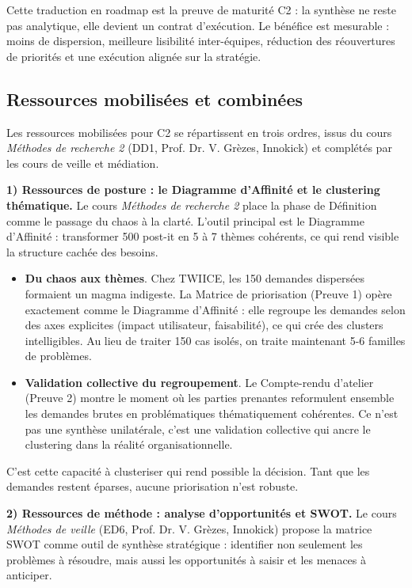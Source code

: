 Cette traduction en roadmap est la preuve de maturité C2 : la synthèse ne reste pas analytique, elle devient un contrat d'exécution. Le bénéfice est mesurable : moins de dispersion, meilleure lisibilité inter-équipes, réduction des réouvertures de priorités et une exécution alignée sur la stratégie.

\subsection{Ressources mobilisées et combinées}

Les ressources mobilisées pour C2 se répartissent en trois ordres, issus du cours \textit{Méthodes de recherche 2} (DD1, Prof. Dr. V. Grèzes, Innokick) et complétés par les cours de veille et médiation.

\textbf{1) Ressources de posture : le Diagramme d'Affinité et le clustering thématique.}
Le cours \textit{Méthodes de recherche 2} place la phase de Définition comme le passage du chaos à la clarté. L'outil principal est le Diagramme d'Affinité : transformer 500 post-it en 5 à 7 thèmes cohérents, ce qui rend visible la structure cachée des besoins.

\begin{itemize}
  \item \textbf{Du chaos aux thèmes}. Chez TWIICE, les 150 demandes dispersées formaient un magma indigeste. La Matrice de priorisation (Preuve 1) opère exactement comme le Diagramme d'Affinité : elle regroupe les demandes selon des axes explicites (impact utilisateur, faisabilité), ce qui crée des clusters intelligibles. Au lieu de traiter 150 cas isolés, on traite maintenant 5-6 familles de problèmes.
  \item \textbf{Validation collective du regroupement}. Le Compte-rendu d'atelier (Preuve 2) montre le moment où les parties prenantes reformulent ensemble les demandes brutes en problématiques thématiquement cohérentes. Ce n'est pas une synthèse unilatérale, c'est une validation collective qui ancre le clustering dans la réalité organisationnelle.
\end{itemize}

C'est cette capacité à clusteriser qui rend possible la décision. Tant que les demandes restent éparses, aucune priorisation n'est robuste.

\textbf{2) Ressources de méthode : analyse d'opportunités et SWOT.}
Le cours \textit{Méthodes de veille} (ED6, Prof. Dr. V. Grèzes, Innokick) propose la matrice SWOT comme outil de synthèse stratégique : identifier non seulement les problèmes à résoudre, mais aussi les opportunités à saisir et les menaces à anticiper.

